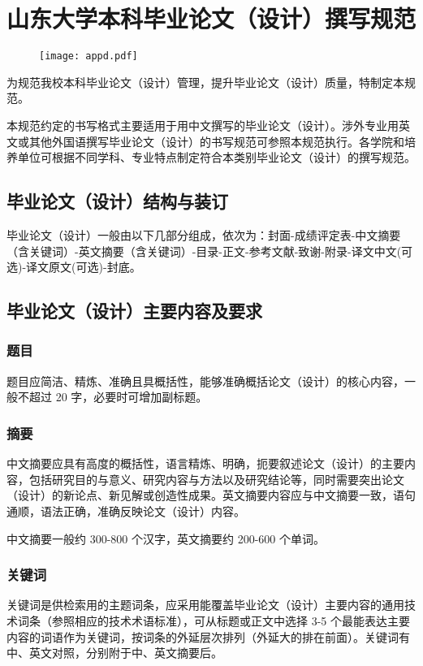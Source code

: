 
\chapter{山东大学本科毕业论文（设计）撰写规范}

\begin{figure}[htbp]
\centering
\texttt{[image: appd.pdf]}
\end{figure}
为规范我校本科毕业论文（设计）管理，提升毕业论文（设计）质量，特制定本规范。

本规范约定的书写格式主要适用于用中文撰写的毕业论文（设计）。涉外专业用英文或其他外国语撰写毕业论文（设计）的书写规范可参照本规范执行。各学院和培养单位可根据不同学科、专业特点制定符合本类别毕业论文（设计）的撰写规范。
\section{毕业论文（设计）结构与装订}
毕业论文（设计）一般由以下几部分组成，依次为：封面-成绩评定表-中文摘要（含关键词）-英文摘要（含关键词）-目录-正文-参考文献-致谢-附录-译文中文(可选)-译文原文(可选)-封底。
\section{毕业论文（设计）主要内容及要求}
\subsection{题目}
题目应简洁、精炼、准确且具概括性，能够准确概括论文（设计）的核心内容，一般不超过 20 字，必要时可增加副标题。
\subsection{摘要}
中文摘要应具有高度的概括性，语言精炼、明确，扼要叙述论文（设计）的主要内容，包括研究目的与意义、研究内容与方法以及研究结论等，同时需要突出论文（设计）的新论点、新见解或创造性成果。英文摘要内容应与中文摘要一致，语句通顺，语法正确，准确反映论文（设计）内容。

中文摘要一般约 300-800 个汉字，英文摘要约 200-600 个单词。
\subsection{关键词}
关键词是供检索用的主题词条，应采用能覆盖毕业论文（设计）主要内容的通用技术词条（参照相应的技术术语标准），可从标题或正文中选择 3-5 个最能表达主要内容的词语作为关键词，按词条的外延层次排列（外延大的排在前面）。关键词有中、英文对照，分别附于中、英文摘要后。
